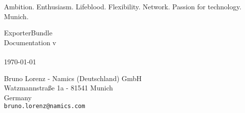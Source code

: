 \begin{titlepage}
\begin{center}
  \begin{minipage}{\textwidth}
    \fontsize{18}{22}
    \selectfont
    \raggedright
    \textcolor{wmark1}{Ambition. Enthusiasm.} \textcolor{wmark2}{Lifeblood.} \textcolor{wmark1}{Flexibility. Network. Passion for technology.} \textcolor{wmark3}{Munich.}
  \end{minipage}

  \begin{minipage}{0.8\textwidth}
    \vspace{3.5cm}
    \Huge ExporterBundle \\[0.4cm]
    \LARGE Documentation v\version\\
    \\
    \normalsize \today \\
  \end{minipage}

  \begin{minipage}{0.5\textwidth}
    \vspace{10cm}
    \begin{center}
    Bruno Lorenz - Namics (Deutschland) GmbH\\
    Watzmannstraße 1a - 81541 Munich\\
    Germany\\
    \texttt{bruno.lorenz@namics.com}
    \end{center}
  \end{minipage}
\end{center}
\end{titlepage}